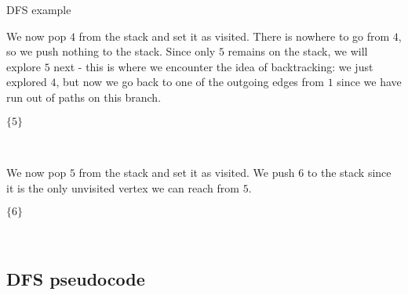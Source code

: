 \documentclass{article}
\begin{document}
\begin{example}{DFS example}
\begin{minipage}{0.4\linewidth}
    \end{minipage}
    \begin{minipage}{0.4\linewidth}
    \centering
        We now pop $4$ from the stack and set it as visited.  There is nowhere to go from $4$, so we push nothing to the stack. Since only $5$ remains on the stack, we will explore $5$ next - this is where we encounter the idea of backtracking: we just explored $4$, but now we go back to one of the outgoing edges from $1$ since we have run out of paths on this branch.
    \end{minipage}
    \begin{minipage}{0.15\linewidth}
    \centering
        $\{5\}$
    \end{minipage}\\
    \begin{minipage}{0.4\linewidth}
    \centering
    \end{minipage}
    \begin{minipage}{0.4\linewidth}
    \centering
        We now pop $5$ from the stack and set it as visited.  We push $6$ to the stack since it is the only unvisited vertex we can reach from $5$.
    \end{minipage}
    \begin{minipage}{0.15\linewidth}
    \centering
        $\{6\}$
    \end{minipage}\\
\end{example}

\newpage

\subsection{DFS pseudocode}
\end{document}
